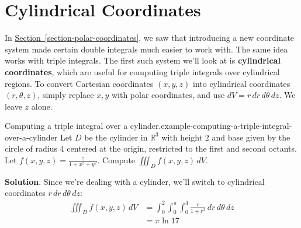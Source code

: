 \documentclass[10pt,]{book}
\newcommand{\terminology}[1]{\textbf{#1}}
\numberwithin{equation}{section}
\newcommand{\RR}{\mathbb{R}}
\begin{document}
\section[{Cylindrical Coordinates}]{Cylindrical Coordinates}\label{section-cylindrical-coordinates}
\hypertarget{p-1520}{}%
In \hyperref[section-polar-coordinates]{Section~\ref{section-polar-coordinates}}, we saw that introducing a new coordinate system made certain double integrals much easier to work with. The same idea works with triple integrals. The first such system we'll look at is \terminology{cylindrical coordinates}, which are useful for computing triple integrals over cylindrical regions. To convert Cartesian coordinates \((x,y,z)\) into cylindrical coordinates \((r,\theta,z)\), simply replace \(x,y\) with polar coordinates, and use \(dV = r\,dr\,d\theta\,dz\). We leave \(z\) alone.%
\begin{example}{Computing a triple integral over a cylinder.}{example-computing-a-triple-integral-over-a-cylinder}%
\hypertarget{p-1521}{}%
Let \(D\) be the cylinder in \(\RR^{3}\) with height \(2\) and base given by the circle of radius \(4\) centered at the origin, restricted to the first and second octants. Let \(f(x,y,z) = \frac{z}{1+x^{2}+y^{2}}\). Compute \(\iiint_{D}f(x,y,z)\,dV\).%
\par\smallskip%
\noindent\textbf{Solution}.\hypertarget{solution-252}{}\quad%
\hypertarget{p-1522}{}%
Since we're dealing with a cylinder, we'll switch to cylindrical coordinates \(r\,dr\,d\theta\,dz\):%
\begin{align*}
\iiint_{D}f(x,y,z)\,dV & = \int_{0}^{2}\int_{0}^{\pi}\int_{0}^{4}\frac{r}{1+r^{2}}\,dr\,d\theta\,dz \\
& = \pi\ln17 
\end{align*}
%
\end{example}
%
%
%
%
\typeout{************************************************}
\typeout{************************************************}
%
%
\appendix
%
\end{document}
